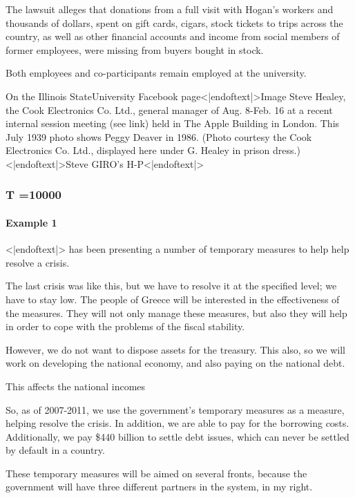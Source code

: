 \documentclass{article} %
\begin{document}
{\begin{appendices}
{The lawsuit alleges that donations from a full visit with Hogan's workers and thousands of dollars, spent on gift cards, cigars, stock tickets to trips across the country, as well as other financial accounts and income from social members of former employees, were missing from buyers bought in stock.

Both employees and co-participants remain employed at the university.

On the Illinois StateUniversity Facebook page<|endoftext|>Image Steve Healey, the Cook Electronics Co. Ltd., general manager of Aug. 8-Feb. 16 at a recent internal session meeting (see link) held in The Apple Building in London. This July 1939 photo shows Peggy Deaver in 1986. (Photo courtesy the Cook Electronics Co. Ltd., displayed here under G. Healey in prison dress.)<|endoftext|>Steve GIRO's H-P<|endoftext|>

}


\subsubsection{T =10000}
\paragraph{Example 1}
{\selectfont
<|endoftext|> has been presenting a number of temporary measures to help help resolve a crisis.

The last crisis was like this, but we have to resolve it at the specified level; we have to stay low. The people of Greece will be interested in the effectiveness of the measures. They will not only manage these measures, but also they will help in order to cope with the problems of the fiscal stability.

However, we do not want to dispose assets for the treasury. This also, so we will work on developing the national economy, and also paying on the national debt.

This affects the national incomes

So, as of 2007-2011, we use the government's temporary measures as a measure, helping resolve the crisis. In addition, we are able to pay for the borrowing costs. Additionally, we pay \$440 billion to settle debt issues, which can never be settled by default in a country.

These temporary measures will be aimed on several fronts, because the government will have three different partners in the system, in my right.

}
\end{appendices}}
\end{document}
